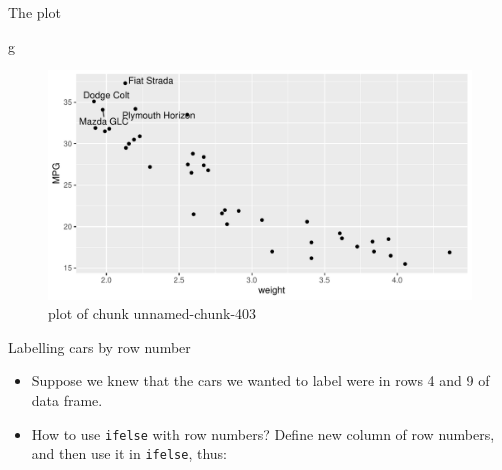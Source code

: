\documentclass[ignorenonframetext,]{beamer}
\newenvironment{Shaded}{\begin{snugshade}}{\end{snugshade}}
\newcommand{\DataTypeTok}[1]{\textcolor[rgb]{0.13,0.29,0.53}{#1}}
\newcommand{\DecValTok}[1]{\textcolor[rgb]{0.00,0.00,0.81}{#1}}
\newcommand{\KeywordTok}[1]{\textcolor[rgb]{0.13,0.29,0.53}{\textbf{#1}}}
\newcommand{\NormalTok}[1]{#1}
\newcommand{\OperatorTok}[1]{\textcolor[rgb]{0.81,0.36,0.00}{\textbf{#1}}}
\newcommand{\StringTok}[1]{\textcolor[rgb]{0.31,0.60,0.02}{#1}}
\providecommand{\tightlist}{%
  \setlength{\itemsep}{0pt}\setlength{\parskip}{0pt}}
\begin{document}
\begin{frame}[fragile]{The plot}
\protect\hypertarget{the-plot-5}{}

\begin{Shaded}
\begin{Highlighting}[]
\NormalTok{g}
\end{Highlighting}
\end{Shaded}

\begin{figure}
\centering
\includegraphics{figure/unnamed-chunk-403-1.pdf}
\caption{plot of chunk unnamed-chunk-403}
\end{figure}

\end{frame}

\begin{frame}[fragile]{Labelling cars by row number}
\protect\hypertarget{labelling-cars-by-row-number}{}

\begin{itemize}
\tightlist
\item
  Suppose we knew that the cars we wanted to label were in rows 4 and 9
  of data frame.
\item
  How to use \texttt{ifelse} with row numbers? Define new column of row
  numbers, and then use it in \texttt{ifelse}, thus:
\end{itemize}

\begin{Shaded}
\end{Shaded}

\end{frame}
\end{document}
